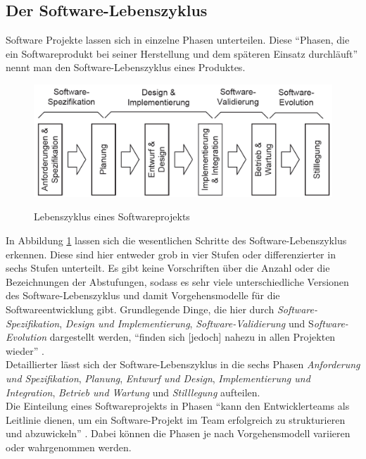 \documentclass [12pt, a4paper, oneside, titlepage, ngerman]{article}
\begin{document}
\subsection{Der Software-Lebenszyklus}
Software Projekte lassen sich in einzelne Phasen unterteilen. Diese "`Phasen, die ein Softwareprodukt bei seiner Herstellung und dem späteren Einsatz durchläuft"' \cite[S.173]{gabler} nennt man den Software-Lebenszyklus eines Produktes.
\begin{figure}[H]
	\centering
	\includegraphics[width=\textwidth,keepaspectratio]{softwarelebenszyklus.PNG}
	\caption{Lebenszyklus eines Softwareprojekts}
	\cite[S.13]{schatten2010}
	\label{img:softwarelebenszyklus}
\end{figure}
\noindent In Abbildung \ref{img:softwarelebenszyklus} lassen sich die wesentlichen Schritte des Software-Lebenszyklus erkennen. Diese sind hier entweder grob in vier Stufen oder differenzierter in sechs Stufen unterteilt. Es gibt keine Vorschriften über die Anzahl oder die Bezeichnungen der Abstufungen, sodass es sehr viele unterschiedliche Versionen des Software-Lebenszyklus und damit Vorgehensmodelle für die Softwareentwicklung gibt. Grundlegende Dinge, die hier durch \textit{Software-Spezifikation}, \textit{Design und Implementierung}, \textit{Software-Validierung} und S\textit{oftware-Evolution} dargestellt werden, "`finden sich [jedoch] nahezu in allen Projekten wieder"' \cite[S.13]{schatten2010}. \\ 
Detaillierter lässt sich der Software-Lebenszyklus in die sechs Phasen \textit{Anforderung und Spezifikation}, \textit{Planung}, \textit{Entwurf und Design}, \textit{Implementierung und Integration}, \textit{Betrieb und Wartung} und \textit{Stilllegung} aufteilen. \\
Die Einteilung eines Softwareprojekts in Phasen "`kann den Entwicklerteams als Leitlinie dienen, um ein Software-Projekt im Team erfolgreich zu strukturieren und abzuwickeln"' \cite[S.11]{schatten2010}. Dabei können die Phasen je nach Vorgehensmodell variieren oder wahrgenommen werden.
\end{document}
